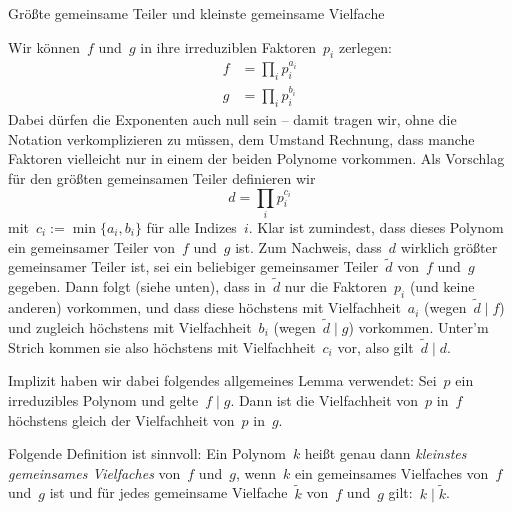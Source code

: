 \documentclass{algblatt}
\begin{document}
\begin{aufgabe}{Größte gemeinsame Teiler und kleinste gemeinsame Vielfache}
\begin{loesungE}
\item Wir können~$f$ und~$g$ in ihre irreduziblen Faktoren~$p_i$ zerlegen:
\begin{align*}
  f &= \prod_i p_i^{a_i} \\
  g &= \prod_i p_i^{b_i}
\end{align*}
Dabei dürfen die Exponenten auch null sein -- damit tragen wir, ohne die
Notation verkomplizieren zu müssen, dem Umstand Rechnung, dass manche Faktoren
vielleicht nur in einem der beiden Polynome vorkommen. Als Vorschlag für den
größten gemeinsamen Teiler definieren wir
\[ d = \prod_i p_i^{c_i} \]
mit~$c_i := \min\{ a_i, b_i \}$ für alle Indizes~$i$. Klar ist zumindest, dass
dieses Polynom ein gemeinsamer Teiler von~$f$ und~$g$ ist. Zum Nachweis,
dass~$d$ wirklich größter gemeinsamer Teiler ist, sei ein beliebiger
gemeinsamer Teiler~$\widetilde d$ von~$f$ und~$g$ gegeben. Dann folgt (siehe
unten), dass in~$\widetilde d$ nur die Faktoren~$p_i$ (und keine anderen)
vorkommen, und dass diese höchstens mit Vielfachheit~$a_i$ (wegen~$\widetilde d
\mid f$) und zugleich höchstens mit Vielfachheit~$b_i$ (wegen~$\widetilde d
\mid g$) vorkommen. Unter'm Strich kommen sie also höchstens mit
Vielfachheit~$c_i$ vor, also gilt~$\widetilde d \mid d$.

Implizit haben wir dabei folgendes allgemeines Lemma verwendet: Sei~$p$ ein irreduzibles
Polynom und gelte~$f \mid g$. Dann ist die Vielfachheit von~$p$ in~$f$
höchstens gleich der Vielfachheit von~$p$ in~$g$.

\item Folgende Definition ist sinnvoll: Ein Polynom~$k$ heißt genau dann
\emph{kleinstes gemeinsames Vielfaches} von~$f$ und~$g$, wenn~$k$ ein
gemeinsames Vielfaches von~$f$ und~$g$ ist und für jedes gemeinsame
Vielfache~$\widetilde k$ von~$f$ und~$g$ gilt:~$k \mid \widetilde k$.
\end{loesungE}
\end{aufgabe}
\end{document}
